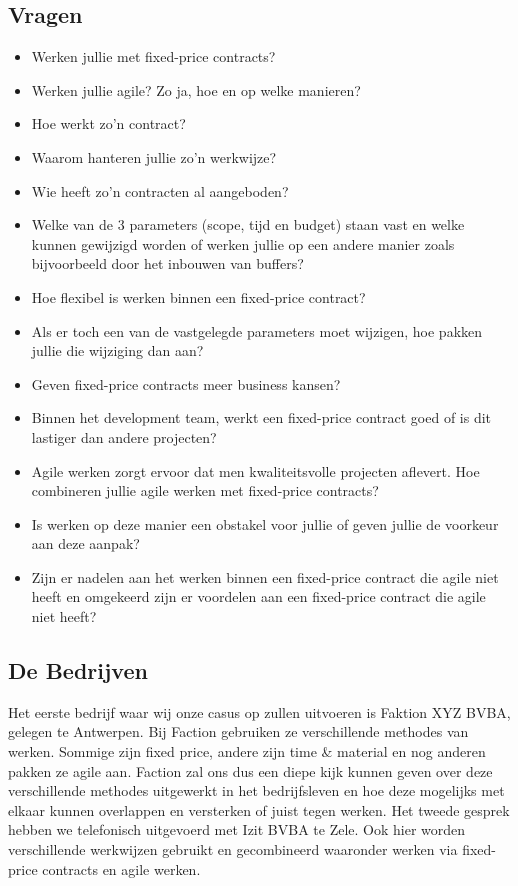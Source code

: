 \documentclass{hogent-article}
\begin{document}
	\subsection{Vragen}
	\begin{itemize}
		\item Werken jullie met fixed-price contracts?
		\item Werken jullie agile? Zo ja, hoe en op welke manieren?
		\item Hoe werkt zo'n contract?
		\item Waarom hanteren jullie zo’n werkwijze?
		\item Wie heeft zo'n contracten al aangeboden?
		\item Welke van de 3 parameters (scope, tijd en budget) staan vast en welke kunnen gewijzigd worden of werken jullie op een andere manier zoals bijvoorbeeld door het inbouwen van buffers?
		\item Hoe flexibel is werken binnen een fixed-price contract?
		\item Als er toch een van de vastgelegde parameters moet wijzigen, hoe pakken jullie die wijziging dan aan?
		\item Geven fixed-price contracts meer business kansen?
		\item Binnen het development team, werkt een fixed-price contract goed of is dit lastiger dan andere projecten?
		\item Agile werken zorgt ervoor dat men kwaliteitsvolle projecten aflevert. Hoe combineren jullie agile werken met fixed-price contracts?
		\item Is werken op deze manier een obstakel voor jullie of geven jullie de voorkeur aan deze aanpak?
		\item Zijn er nadelen aan het werken binnen een fixed-price contract die agile niet heeft en omgekeerd zijn er voordelen aan een fixed-price contract die agile niet heeft?
	\end{itemize}
		
    \subsection{De Bedrijven}
    Het eerste bedrijf waar wij onze casus op zullen uitvoeren is Faktion XYZ BVBA, gelegen te Antwerpen. Bij Faction gebruiken ze verschillende methodes van werken. Sommige zijn fixed price, andere zijn time \& material en nog anderen pakken ze agile aan. Faction zal ons dus een diepe kijk kunnen geven over deze verschillende methodes uitgewerkt in het bedrijfsleven en hoe deze mogelijks met elkaar kunnen overlappen en versterken of juist tegen werken.
    \linebreak
    \linebreak
    Het tweede gesprek hebben we telefonisch uitgevoerd met Izit BVBA te Zele. Ook hier worden verschillende werkwijzen gebruikt en gecombineerd waaronder werken via fixed-price contracts en agile werken.
    
\end{document}
